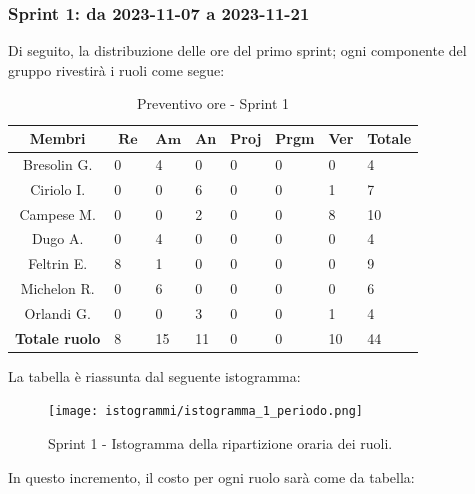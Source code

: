 \documentclass[10pt, a4paper]{article}
\begin{document}
{{{{{{{{\subsubsection{Sprint 1: da 2023-11-07 a 2023-11-21}
Di seguito, la distribuzione delle ore del primo sprint; ogni componente del gruppo rivestirà i ruoli come segue:
\begin{table}[H]
\begin{tabularx}{\textwidth}{c|X|X|X|X|X|X|X}
        \textbf{Membri} & $\operatorname{\textbf{Re}}$ & $\mathrm{\textbf{Am}}$ & \textbf{An} & \textbf{Proj} & \textbf{Prgm} & \textbf{Ver} & \textbf{Totale} \\
        \hline Bresolin G. & 0 & \cellcolor{primarycolor}4 & 0 & 0 & 0 & 0 & 4 \\
        \hline Ciriolo I.  & 0 & 0 & \cellcolor{primarycolor}6 & 0 & 0 & 1 & 7 \\
        \hline Campese M.  & 0 & 0 & 2 & 0 & 0 & \cellcolor{primarycolor}8 & 10 \\
        \hline Dugo A.     & 0 & \cellcolor{primarycolor}4 & 0 & 0 & 0 & 0 & 4 \\
        \hline Feltrin E.  & \cellcolor{primarycolor}8 & 1 & 0 & 0 & 0 & 0 & 9 \\
        \hline Michelon R. & 0 & \cellcolor{primarycolor}6 & 0 & 0 & 0 & 0 & 6 \\
        \hline Orlandi G.  & 0 & 0 & \cellcolor{primarycolor}3 & 0 & 0 & 1 & 4 \\
        \hline
        \textbf{Totale ruolo} & 8 & 15 & 11 & 0 & 0 & 10 & 44 
    \end{tabularx}
    \caption{Preventivo ore - Sprint 1}
    \end{table}

La tabella è riassunta dal seguente istogramma:
 \begin{figure}[H]
        \centering        
        \texttt{[image: istogrammi/istogramma\_1\_periodo.png]}
        \caption{Sprint 1 - Istogramma della ripartizione oraria dei ruoli. }
    \end{figure}
 
In questo incremento, il costo per ogni ruolo sarà come da tabella:
{\renewcommand{\arraystretch}{1.5}
\begin{table}[H]
\centering
\begin{tabularx}{0.42\textwidth}{c|c|c}


\end{tabularx}
\end{table}}}}}}}}}}
\end{document}

